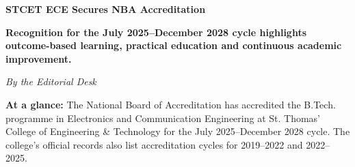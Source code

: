 \begin{center}
  {\LARGE\bfseries STCET ECE Secures NBA Accreditation\par}
  \vspace{0.45em}
  {\large\bfseries\color{IEEEblue}
  Recognition for the July 2025--December 2028 cycle highlights outcome-based learning, practical education and continuous academic improvement.\par}
  \vspace{0.5em}
  {\small\itshape By the Editorial Desk}
\end{center}

\begin{tcolorbox}[
  colback=SoftBlue,
  colframe=IEEEblue!75!black,
  boxrule=0.6pt,
  arc=0mm,
  left=3mm,right=3mm,top=2mm,bottom=2mm
]
  \small\RaggedRight
  \textbf{At a glance:} The National Board of Accreditation has accredited the B.Tech. programme in Electronics and Communication Engineering at St. Thomas' College of Engineering \& Technology for the July 2025--December 2028 cycle. The college's official records also list accreditation cycles for 2019--2022 and 2022--2025.
\end{tcolorbox}

